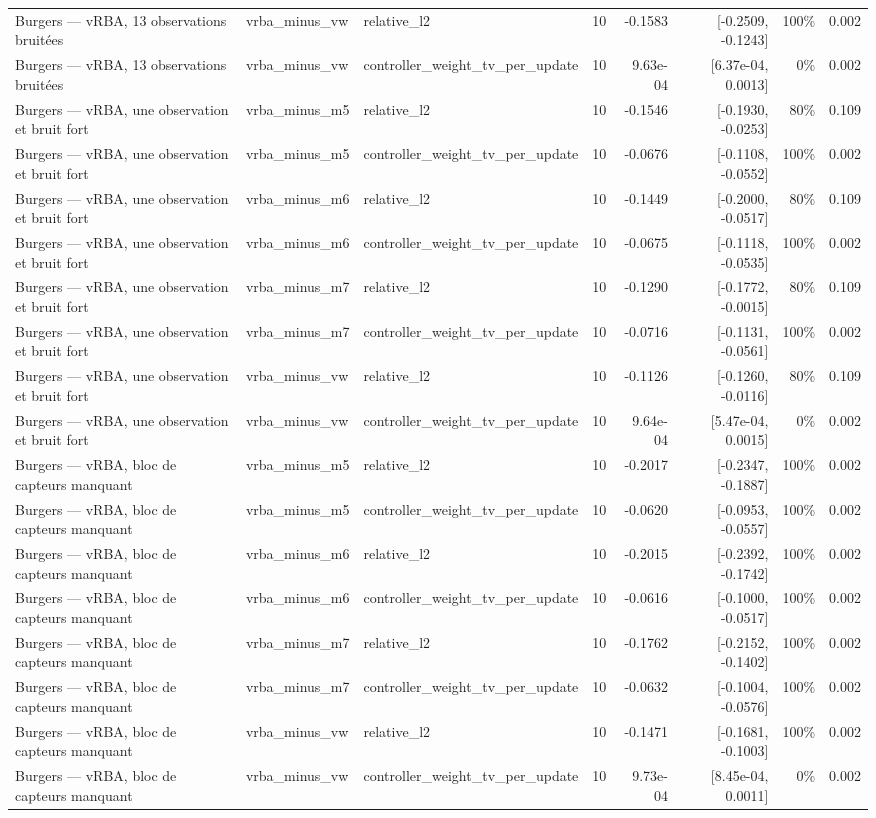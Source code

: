 \begin{tabular}{llllrrrr}
Burgers — vRBA, 13 observations bruitées & vrba\_minus\_vw & relative\_l2 & 10 & -0.1583 & [-0.2509, -0.1243] & 100\% & 0.002 \\
Burgers — vRBA, 13 observations bruitées & vrba\_minus\_vw & controller\_weight\_tv\_per\_update & 10 & 9.63e-04 & [6.37e-04, 0.0013] & 0\% & 0.002 \\
Burgers — vRBA, une observation et bruit fort & vrba\_minus\_m5 & relative\_l2 & 10 & -0.1546 & [-0.1930, -0.0253] & 80\% & 0.109 \\
Burgers — vRBA, une observation et bruit fort & vrba\_minus\_m5 & controller\_weight\_tv\_per\_update & 10 & -0.0676 & [-0.1108, -0.0552] & 100\% & 0.002 \\
Burgers — vRBA, une observation et bruit fort & vrba\_minus\_m6 & relative\_l2 & 10 & -0.1449 & [-0.2000, -0.0517] & 80\% & 0.109 \\
Burgers — vRBA, une observation et bruit fort & vrba\_minus\_m6 & controller\_weight\_tv\_per\_update & 10 & -0.0675 & [-0.1118, -0.0535] & 100\% & 0.002 \\
Burgers — vRBA, une observation et bruit fort & vrba\_minus\_m7 & relative\_l2 & 10 & -0.1290 & [-0.1772, -0.0015] & 80\% & 0.109 \\
Burgers — vRBA, une observation et bruit fort & vrba\_minus\_m7 & controller\_weight\_tv\_per\_update & 10 & -0.0716 & [-0.1131, -0.0561] & 100\% & 0.002 \\
Burgers — vRBA, une observation et bruit fort & vrba\_minus\_vw & relative\_l2 & 10 & -0.1126 & [-0.1260, -0.0116] & 80\% & 0.109 \\
Burgers — vRBA, une observation et bruit fort & vrba\_minus\_vw & controller\_weight\_tv\_per\_update & 10 & 9.64e-04 & [5.47e-04, 0.0015] & 0\% & 0.002 \\
Burgers — vRBA, bloc de capteurs manquant & vrba\_minus\_m5 & relative\_l2 & 10 & -0.2017 & [-0.2347, -0.1887] & 100\% & 0.002 \\
Burgers — vRBA, bloc de capteurs manquant & vrba\_minus\_m5 & controller\_weight\_tv\_per\_update & 10 & -0.0620 & [-0.0953, -0.0557] & 100\% & 0.002 \\
Burgers — vRBA, bloc de capteurs manquant & vrba\_minus\_m6 & relative\_l2 & 10 & -0.2015 & [-0.2392, -0.1742] & 100\% & 0.002 \\
Burgers — vRBA, bloc de capteurs manquant & vrba\_minus\_m6 & controller\_weight\_tv\_per\_update & 10 & -0.0616 & [-0.1000, -0.0517] & 100\% & 0.002 \\
Burgers — vRBA, bloc de capteurs manquant & vrba\_minus\_m7 & relative\_l2 & 10 & -0.1762 & [-0.2152, -0.1402] & 100\% & 0.002 \\
Burgers — vRBA, bloc de capteurs manquant & vrba\_minus\_m7 & controller\_weight\_tv\_per\_update & 10 & -0.0632 & [-0.1004, -0.0576] & 100\% & 0.002 \\
Burgers — vRBA, bloc de capteurs manquant & vrba\_minus\_vw & relative\_l2 & 10 & -0.1471 & [-0.1681, -0.1003] & 100\% & 0.002 \\
Burgers — vRBA, bloc de capteurs manquant & vrba\_minus\_vw & controller\_weight\_tv\_per\_update & 10 & 9.73e-04 & [8.45e-04, 0.0011] & 0\% & 0.002 \\
\bottomrule
\end{tabular}
